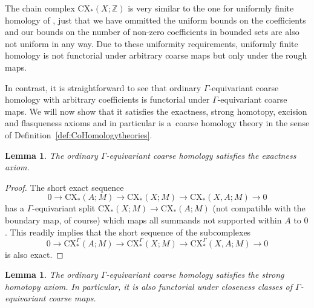\documentclass[pdftex]{sigma}
\numberwithin{equation}{section}
\newtheorem{lem}[thm]{Lemma}
\theoremstyle{definition}
\newcommand{\Z}{\mathbb{Z}}
\newcommand{\CX}{\mathrm{CX}}
\begin{document}
The chain complex $\CX_*(X;\Z)$ is very similar to the one for uniformly finite homology of \cite[Section 2]{BlockWeinberger}, just that we have ommitted the uniform bounds on the coefficients and our bounds on the number of non-zero coefficients in bounded sets are also not uniform in any way.
Due to these uniformity requirements, uniformly finite homology is not functorial under arbitrary coarse maps but only under the rough maps.

In contrast, it is straightforward to see that ordinary $\Gamma$-equivariant coarse homology with arbitrary coefficients is functorial under $\Gamma$-equivariant coarse maps.
We will now show that it satisfies the exactness, strong homotopy, excision and flasqueness axioms and in particular is a~coarse homology theory in the sense of Definition~\ref{def:CoHomologytheories}.

\begin{lem}
The ordinary $\Gamma$-equivariant coarse homology satisfies the exactness axiom.
\end{lem}
\begin{proof}
The short exact sequence
\[
0\to \CX_*(A;M)\to\CX_*(X;M)\to \CX_*(X,A;M)\to 0
\]
has a $\Gamma$-equivariant split $\CX_*(X;M)\to \CX_*(A;M)$ (not compatible with the boundary map, of course) which maps all summands not supported within $A$ to $0$. This readily implies that the short sequence of the subcomplexes
\[
0\to \CX_*^\Gamma(A;M)\to\CX_*^\Gamma(X;M)\to \CX_*^\Gamma(X,A;M)\to 0
\]
is also exact.
\end{proof}



\begin{lem}\label{lem:ordinarycoarsehomologystronghomotopy}
The ordinary $\Gamma$-equivariant coarse homology satisfies the strong homotopy axiom. In particular, it is also functorial under \emph{closeness classes} of $\Gamma$-equivariant coarse maps.
\end{lem}
\end{document}
